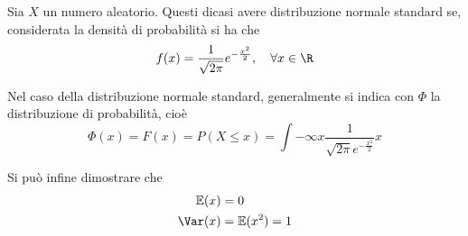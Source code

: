 \documentclass{subfiles}
\begin{document}
Sia \(X\) un numero aleatorio. Questi dicasi avere distribuzione normale standard se, considerata la densità di probabilità si ha che
\[
    f(x) = \frac{1}{\sqrt{2 \pi}} e^{- \frac{x^{2}}{2}}, \quad \forall x \in \R
\]

\noindent Nel caso della distribuzione normale standard, generalmente si indica con \(\Phi\) la distribuzione di probabilità, cioè
\[
    \Phi(x) = F(x) = P(X \le x) = \int{- \infty}{x}{\frac{1}{\sqrt{2 \pi} e^{- \frac{x^{2}}{2}}}}{x}
\]

\noindent Si può infine dimostrare che
\[\begin{aligned}
        \mathbb{E}(x) & = 0                     \\
        \Var(x)       & = \mathbb{E}(x^{2}) = 1
    \end{aligned}\]
\end{document}
